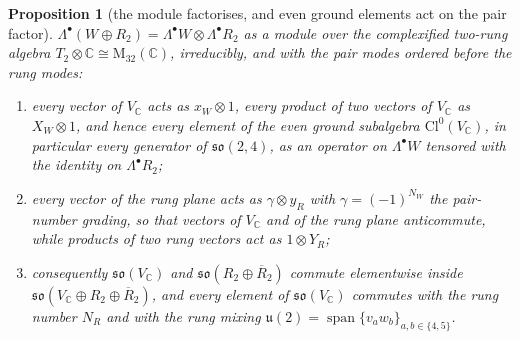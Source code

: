 \documentclass[11pt]{article}
\newtheorem{proposition}[theorem]{Proposition}
\theoremstyle{definition}
\newcommand{\Cl}{\mathrm{Cl}}
\newcommand{\C}{\mathbb{C}}
\newcommand{\uu}{\mathfrak{u}}
\newcommand{\so}{\mathfrak{so}}
\begin{document}
\begin{proposition}[the module factorises, and even ground elements act on the pair factor]\label{prop:factor}
$\Lambda^{\bullet}(W \oplus R_{2}) = \Lambda^{\bullet}W \otimes \Lambda^{\bullet}R_{2}$ as a module over the complexified two-rung algebra $T_{2} \otimes \C \cong \mathrm{M}_{32}(\C)$, irreducibly, and with the pair modes ordered before the rung modes:
\begin{enumerate}
\item[(1)] every vector of $V_{\C}$ acts as $x_{W} \otimes 1$, every product of two vectors of $V_{\C}$ as $X_{W} \otimes 1$, and hence every element of the even ground subalgebra $\Cl^{0}(V_{\C})$, in particular every generator of $\so(2,4)$, as an operator on $\Lambda^{\bullet}W$ tensored with the identity on $\Lambda^{\bullet}R_{2}$;
\item[(2)] every vector of the rung plane acts as $\gamma \otimes y_{R}$ with $\gamma = (-1)^{N_{W}}$ the pair-number grading, so that vectors of $V_{\C}$ and of the rung plane anticommute, while products of two rung vectors act as $1 \otimes Y_{R}$;
\item[(3)] consequently $\so(V_{\C})$ and $\so(R_{2} \oplus \overline{R}_{2})$ commute elementwise inside $\so(V_{\C} \oplus R_{2} \oplus \overline{R}_{2})$, and every element of $\so(V_{\C})$ commutes with the rung number $N_{R}$ and with the rung mixing $\uu(2) = \operatorname{span}\{v_{a}w_{b}\}_{a, b \in \{4, 5\}}$.
\end{enumerate}
\end{proposition}
\end{document}
